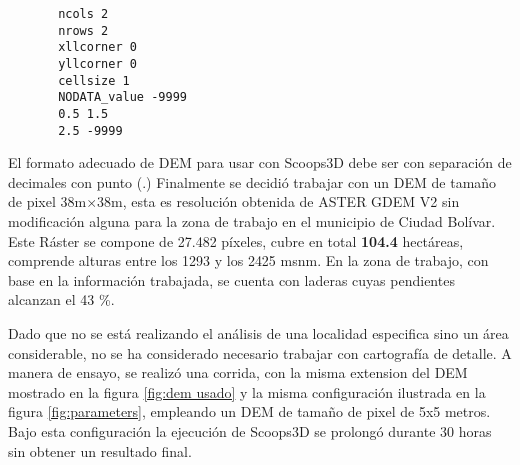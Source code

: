 \newpage
\begin{verbatim}
	   ncols 2
	   nrows 2
	   xllcorner 0
	   yllcorner 0
	   cellsize 1
	   NODATA_value -9999
	   0.5 1.5
	   2.5 -9999
\end{verbatim}


El formato adecuado de DEM para usar con Scoops3D debe ser con separaci\'{o}n de
decimales con punto (.)
Finalmente se decidi\'{o} trabajar con un DEM de tama\~no de pixel 38m$\times$38m, esta es
resoluci\'{o}n obtenida de ASTER GDEM V2 sin modificaci\'on alguna para la zona de trabajo en el municipio de Ciudad Bol\'{i}var.
Este R\'aster se compone de 27.482 p\'ixeles, cubre en total \textbf{104.4 } hect\'areas,
comprende alturas entre los 1293 y los 2425 msnm.
En la zona de trabajo, con base en la informaci\'{o}n trabajada, se cuenta con laderas cuyas
pendientes alcanzan el 43 \%.

Dado que no se est\'a realizando el an\'alisis de una localidad especifica sino un \'area considerable, no se ha considerado necesario trabajar con cartograf\'ia de detalle. A manera de ensayo, se realiz\'o una corrida, con la misma extension del DEM mostrado en la figura \ref{fig:dem usado} y la misma configuraci\'on ilustrada en la figura \ref{fig:parameters}, empleando un DEM de tama\~no de pixel de 5x5 metros.
Bajo esta configuraci\'on la ejecuci\'on de Scoops3D se prolong\'o durante 30 horas sin obtener un resultado final.
